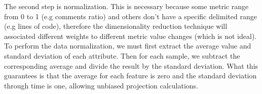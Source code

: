 The second step is normalization. This is necessary because some metric range from 0 to 1 (e.g comments ratio) and others don't have a specific delimited range (e.g lines of code), therefore the dimensionality reduction technique will associated different weights to different metric value changes (which is not ideal). To perform the data normalization, we must first extract the average value and standard deviation of each attribute. Then for each sample, we subtract the corresponding average and divide the result by the standard deviation. What this guarantees is that the average for each feature is zero and the standard deviation through time is one, allowing unbiased projection calculations.
